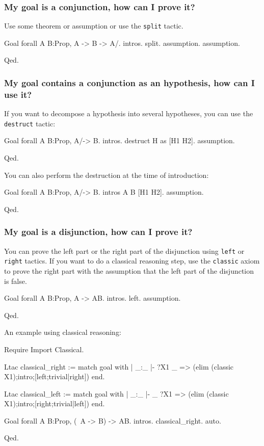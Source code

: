 \documentclass[a4paper,pdftex]{article}
\def\Question#1{\stepcounter{question}\subsubsection{#1}}
\def\split{{\tt split}}
\def\left{{\tt left}}
\def\right{{\tt right}}
\def\destruct{{\tt destruct}}
\begin{document}
\Question{My goal is a conjunction, how can I prove it?}

Use some theorem or assumption or use the {\split} tactic.
\begin{coq_example}
Goal forall A B:Prop, A -> B -> A/\B.
intros.
split.
assumption.
assumption.
\end{coq_example}
\begin{coq_example*}
Qed.
\end{coq_example*}

\Question{My goal contains a conjunction as an hypothesis, how can I use it?}

If you want to decompose a hypothesis into several hypotheses, you can
use the {\destruct} tactic:

\begin{coq_example}
Goal forall A B:Prop, A/\B -> B.
intros.
destruct H as [H1 H2].
assumption.
\end{coq_example}
\begin{coq_example*}
Qed.
\end{coq_example*}

You can also perform the destruction at the time of introduction:

\begin{coq_example}
Goal forall A B:Prop, A/\B -> B.
intros A B [H1 H2].
assumption.
\end{coq_example}
\begin{coq_example*}
Qed.
\end{coq_example*}

\Question{My goal is a disjunction, how can I prove it?}

You can prove the left part or the right part of the disjunction using
{\left} or {\right} tactics. If you want to do a classical
reasoning step, use the {\tt classic} axiom to prove the right part with the assumption
that the left part of the disjunction is false.

\begin{coq_example}
Goal forall A B:Prop, A -> A\/B.
intros.
left.
assumption.
\end{coq_example}
\begin{coq_example*}
Qed.
\end{coq_example*}

An example using classical reasoning:

\begin{coq_example}
Require Import Classical.

Ltac classical_right :=
match goal with
| _:_ |- ?X1 \/ _ => (elim (classic X1);intro;[left;trivial|right])
end.

Ltac classical_left :=
match goal with
| _:_ |- _ \/ ?X1 => (elim (classic X1);intro;[right;trivial|left])
end.


Goal forall A B:Prop, (~A -> B) -> A\/B.
intros.
classical_right.
auto.
\end{coq_example}
\begin{coq_example*}
Qed.
\end{coq_example*}
\end{document}
